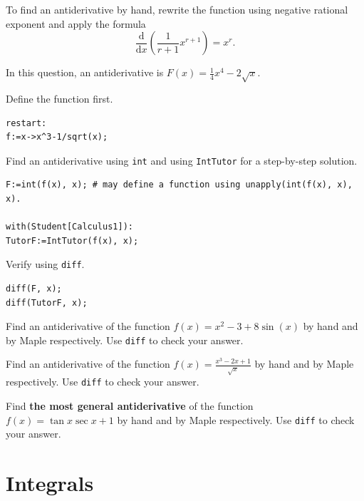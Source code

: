 \documentclass[en,11pt,simple]{elegantbook}
\let\BeginKnitrBlock\begin \let\EndKnitrBlock\end
\begin{document}
\BeginKnitrBlock{solution}{}{}
{}
To find an antiderivative by hand, rewrite the function using negative rational exponent and apply the formula
\[
\frac{\mathrm{d}}{\mathrm{d}x}\left(\frac{1}{r+1}x^{r+1}\right)=x^r.
\]

In this question, an antiderivative is \(F(x)=\frac14x^4-2\sqrt{x}\).

Define the function first.

\begin{verbatim}
restart:
f:=x->x^3-1/sqrt(x);
\end{verbatim}

Find an antiderivative using \texttt{int} and using \texttt{IntTutor} for a step-by-step solution.

\begin{verbatim}
F:=int(f(x), x); # may define a function using unapply(int(f(x), x), x).

with(Student[Calculus1]):
TutorF:=IntTutor(f(x), x);
\end{verbatim}

Verify using \texttt{diff}.

\begin{verbatim}
diff(F, x);
diff(TutorF, x);
\end{verbatim}
\EndKnitrBlock{solution}

\BeginKnitrBlock{exercise}{}{}
\protect\hypertarget{exr:unnamed-chunk-128}{}{\label{exr:unnamed-chunk-128} }
Find an antiderivative of the function \(f(x)=x^2-3+8\sin(x)\) by hand and by Maple respectively. Use \texttt{diff} to check your answer.
\EndKnitrBlock{exercise}

\BeginKnitrBlock{exercise}{}{}
\protect\hypertarget{exr:unnamed-chunk-129}{}{\label{exr:unnamed-chunk-129} }
Find an antiderivative of the function \(f(x)=\frac{x^3-2x+1}{\sqrt{x}}\) by hand and by Maple respectively. Use \texttt{diff} to check your answer.
\EndKnitrBlock{exercise}

\BeginKnitrBlock{exercise}{}{}
\protect\hypertarget{exr:unnamed-chunk-130}{}{\label{exr:unnamed-chunk-130} }
Find \textbf{the most general antiderivative} of the function \(f(x)=\tan x\sec x+1\) by hand and by Maple respectively. Use \texttt{diff} to check your answer.
\EndKnitrBlock{exercise}

\hypertarget{integrals}{%
\chapter{Integrals}\label{integrals}}
\end{document}
